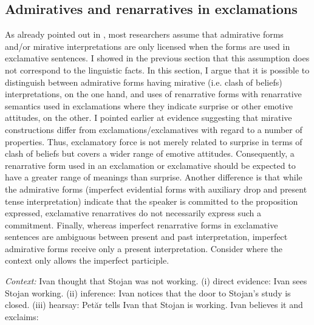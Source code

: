 \documentclass[output=paper]{langscibook}
\begin{document}
\subsection{Admiratives and renarratives in exclamations}\label{sec:renarr_admir}\largerpage

As already pointed out in , most researchers assume that admirative forms and/or mirative interpretations are only licensed when the forms are used in exclamative sentences. I showed in the previous section that this assumption does not correspond to the linguistic facts. In this section, I argue that it is possible to distinguish between admirative forms having mirative (i.e. clash of beliefs) interpretations, on the one hand, and uses of renarrative forms with renarrative semantics used in exclamations where they indicate surprise or other emotive attitudes, on the other. I pointed earlier at evidence suggesting that mirative constructions differ from exclamations/exclamatives with regard to a number of properties. Thus, exclamatory force is not merely related to surprise in terms of clash of beliefs but covers a wider range of emotive attitudes. Consequently, a renarrative form used in an exclamation or exclamative should be expected to have a greater range of meanings than surprise.
%
Another difference is that while the admirative forms (imperfect evidential forms with auxiliary drop and present tense interpretation) indicate that the speaker is committed to the proposition expressed, exclamative renarratives do not necessarily express such a commitment. Finally, whereas imperfect renarrative forms in exclamative sentences are ambiguous between present and past interpretation, imperfect admirative forms receive only a present interpretation. Consider  where the context only allows the imperfect participle.

\eanoraggedright\label{ex:Simeonova-rep}
\textit{Context:} Ivan thought that Stojan was not working. (i) direct evidence: Ivan sees Stojan working.
(ii) inference: Ivan notices that the door to Stojan's study is closed.
(iii) hearsay: Petăr tells Ivan that Stojan is working.
Ivan believes it and exclaims:
\end{document}
